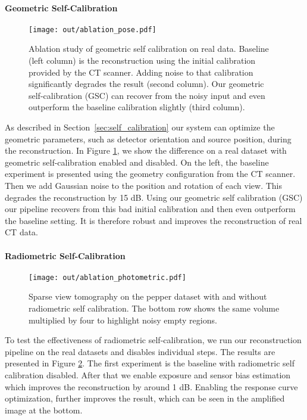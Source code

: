 \documentclass[acmtog,nonacm]{acmart} \acmSubmissionID{0438}
\begin{document}
\paragraph{Geometric Self-Calibration}
\begin{figure}
\texttt{[image: out/ablation\_pose.pdf]}
	\caption{
		Ablation study of geometric self calibration on real data. 
		Baseline (left column) is the reconstruction using the initial calibration provided by the CT scanner.
		Adding noise to that calibration significantly degrades the result (second column).
		Our geometric self-calibration (GSC) can recover from the noisy input and even outperform the baseline calibration slightly (third column).
	}
	\label{fig:pose_opt}
\end{figure}
As described in Section~\ref{sec:self_calibration} our system can optimize the geometric parameters, such as detector orientation and source position, during the reconstruction.
In Figure \ref{fig:pose_opt}, we show the difference on a real dataset with geometric self-calibration enabled and disabled.
On the left, the baseline experiment is presented using the geometry configuration from the CT scanner.
Then we add Gaussian noise to the position and rotation of each view.
This degrades the reconstruction by 15 dB.
Using our geometric self calibration (GSC) our pipeline recovers from this bad initial calibration and then even outperform the baseline setting.
It is therefore robust and improves the reconstruction of real CT data.


\paragraph{Radiometric Self-Calibration}
\begin{figure}
\texttt{[image: out/ablation\_photometric.pdf]}
	\caption{
		Sparse view tomography on the pepper dataset with and without radiometric self calibration.
		The bottom row shows the same volume multiplied by four to highlight noisy empty regions.	
	}
	\label{fig:photomeric}
\end{figure}
To test the effectiveness of radiometric self-calibration, we run our reconstruction pipeline on the real datasets and disables individual steps.
The results are presented in Figure \ref{fig:photomeric}.
The first experiment is the baseline with radiometric self calibration disabled.
After that we enable exposure and sensor bias estimation which improves the reconstruction by around 1 dB.
Enabling the response curve optimization, further improves the result, which can be seen in the amplified image at the bottom.
\end{document}
